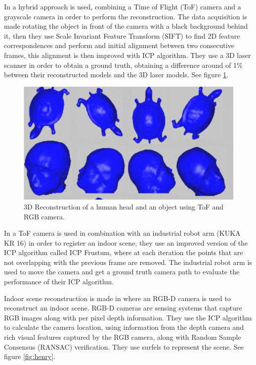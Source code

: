 In \cite{guangyu} a hybrid approach is used, combining a Time of Flight (ToF) camera and a grayscale camera in order to perform the reconstruction. 
The data acquisition is made rotating the object in front of the camera with a black background behind it, then they use 
Scale Invariant Feature Transform (SIFT) to find 2D feature correspondences and perform and initial alignment between two consecutive frames, this alignment is 
then improved with ICP algorithm. They use a 3D laser scanner in order to obtain a ground truth, obtaining a difference around of 1\% 
between their reconstructed
 models and the 3D laser models. See figure \ref{fig:guangyu}.




\begin{figure}[h!]
\begin{center}
\includegraphics[scale=0.38]{images/guangyu}
\caption{3D Reconstruction of a human head and an object using ToF and RGB camera.}
\label{fig:guangyu}
\end{center}
\end{figure}

In \cite{may2009} a ToF camera is used in combination with an industrial robot arm (KUKA KR 16) in order to register an indoor scene,
they use an improved version of the ICP algorithm called ICP Frustum, where at each iteration the points that are not overlapping with the previous frame are removed. The industrial robot arm is used to move the camera and get a ground truth camera path to evaluate the performance of their ICP algorithm. 



 Indoor scene reconstruction is made in \cite{henry} where an RGB-D camera is used to reconstruct an indoor scene. RGB-D cameras are sensing systems that capture RGB images
 along with per pixel depth information. They use the ICP algorithm to calculate the camera location, using information from 
the depth camera and  rich visual
 features captured by the RGB camera, along with Random Sample Consensus (RANSAC) verification. They use surfels \cite{pfister} to represent the scene. See figure \ref{fig:henry}.

